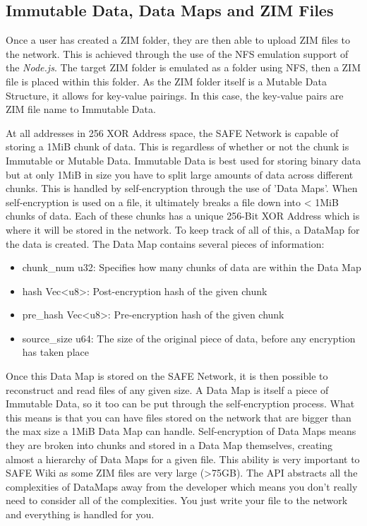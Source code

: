 \subsection{Immutable Data, Data Maps and ZIM Files}

Once a user has created a ZIM folder, they are then able to upload ZIM files to the network. This is achieved through the use of the NFS  emulation support of the \textit{Node.js}. The target ZIM folder is emulated as a folder using NFS, then a ZIM file is placed within this folder. As the ZIM folder itself is a Mutable Data Structure, it allows for key-value pairings. In this case, the key-value pairs are ZIM file name to Immutable Data.

At all addresses in 256 XOR Address space, the SAFE Network is capable of storing a 1MiB chunk of data. This is regardless of whether or not the chunk is Immutable or Mutable Data. Immutable Data is best used for storing binary data but at only 1MiB in size you have to split large amounts of data across different chunks. This is handled by self-encryption through the use of 'Data Maps'. When self-encryption is used on a file, it ultimately breaks a file down into < 1MiB chunks of data. Each of these chunks has a unique 256-Bit XOR Address which is where it will be stored in the network. To keep track of all of this, a DataMap for the data is created. The Data Map contains several pieces of information:

\begin{itemize}
	\item chunk\_num u32: Specifies how many chunks of data are within the Data Map
	\item hash Vec\textless u8\textgreater: Post-encryption hash of the given chunk
	\item pre\_hash Vec\textless u8\textgreater: Pre-encryption hash of the given chunk
	\item source\_size u64: The size of the original piece of data, before any encryption has taken place
\end{itemize}

Once this Data Map is stored on the SAFE Network, it is then possible to reconstruct and read files of any given size. A Data Map is itself a piece of Immutable Data, so it too can be put through the self-encryption process. What this means is that you can have files stored on the network that are bigger than the max size a 1MiB Data Map can handle. Self-encryption of Data Maps means they are broken into chunks and stored in a Data Map themselves, creating almost a hierarchy of Data Maps for a given file. This ability is very important to SAFE Wiki as some ZIM files are very large (\textgreater 75GB). The API abstracts all the complexities of DataMaps away from the developer which means you don't really need to consider all of the complexities. You just write your file to the network and everything is handled for you.

